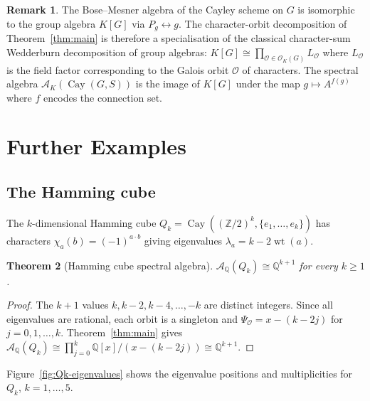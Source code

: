 \documentclass[12pt]{amsart}
\numberwithin{equation}{section}
\theoremstyle{plain}
\newtheorem{theorem}{Theorem}[section]
\theoremstyle{definition}
\newtheorem{remark}[theorem]{Remark}
\DeclareMathOperator{\wt}{wt}
\DeclareMathOperator{\Cay}{Cay}
\newcommand{\Z}{\mathbb{Z}}
\newcommand{\Q}{\mathbb{Q}}
\newcommand{\calA}{\mathcal{A}}
\newcommand{\calO}{\mathcal{O}}
\begin{document}
\begin{remark}
The Bose--Mesner algebra of the Cayley scheme on $G$ is isomorphic to
the group algebra $K[G]$ via $P_g \leftrightarrow g$.  The character-orbit
decomposition of Theorem~\ref{thm:main} is therefore a specialisation of
the classical character-sum Wedderburn decomposition of group algebras:
$K[G] \cong \prod_{\calO \in \calO_K(G)} L_\calO$ where $L_\calO$ is the
field factor corresponding to the Galois orbit $\calO$ of characters.  The
spectral algebra $\calA_K(\Cay(G,S))$ is the image of $K[G]$ under the
map $g \mapsto A^{f(g)}$ where $f$ encodes the connection set.
\end{remark}

\section{Further Examples}
\label{sec:examples}

\subsection{The Hamming cube}

\begin{sloppypar}
The $k$-dimensional Hamming cube
$Q_k = \Cay((\Z/2)^k, \{e_1, \ldots, e_k\})$ has
characters $\chi_a(b) = (-1)^{a \cdot b}$ giving
eigenvalues $\lambda_a = k - 2\wt(a)$.
\end{sloppypar}

\begin{theorem}[Hamming cube spectral algebra]
\label{thm:hamming}
$\calA_\Q(Q_k) \cong \Q^{k+1}$ for every $k \ge 1$.
\end{theorem}

\begin{proof}
The $k+1$ values $k, k-2, k-4, \ldots, -k$ are distinct integers.
Since all eigenvalues are rational, each orbit is a singleton and
$\Psi_\calO = x - (k - 2j)$ for $j = 0, 1, \ldots, k$.
Theorem~\ref{thm:main} gives
$\calA_\Q(Q_k) \cong \prod_{j=0}^k \Q[x]/(x-(k-2j)) \cong \Q^{k+1}$.
\end{proof}

Figure~\ref{fig:Qk-eigenvalues} shows the eigenvalue positions and
multiplicities for $Q_k$, $k = 1, \ldots, 5$.
\end{document}
